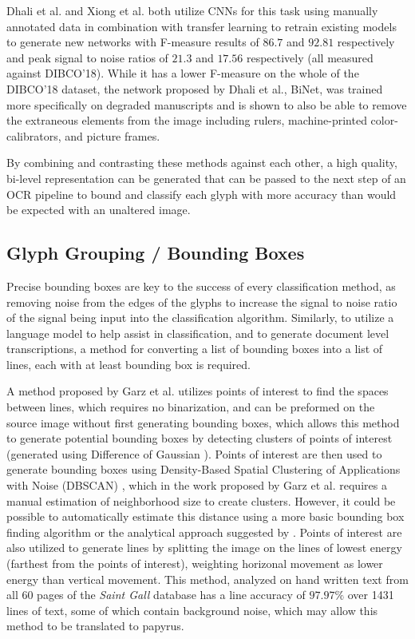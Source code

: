 \documentclass[12pt,a4paper,final]{article}
\begin{document}
Dhali et al.\cite{Dhali2019} and Xiong et al.\cite{Xiong} both utilize CNNs for this task using manually annotated data in combination with transfer learning to retrain existing models to generate new networks with F-measure results of $86.7$ and $92.81$ respectively and peak signal to noise ratios of $21.3$ and $17.56$ respectively (all measured against DIBCO'18). While it has a lower F-measure on the whole of the DIBCO'18 dataset, the network proposed by Dhali et al., BiNet, was trained more specifically on degraded manuscripts and is shown to also be able to remove the extraneous elements from the image including rulers, machine-printed color-calibrators, and picture frames.

By combining and contrasting these methods against each other, a high quality, bi-level representation can be generated that can be passed to the next step of an OCR pipeline to bound and classify each glyph with more accuracy than would be expected with an unaltered image.

\subsection{Glyph Grouping / Bounding Boxes}
Precise bounding boxes are key to the success of every classification method, as removing noise from the edges of the glyphs to increase the signal to noise ratio of the signal being input into the classification algorithm. Similarly, to utilize a language model to help assist in classification, and to generate document level transcriptions, a method for converting a list of bounding boxes into a list of lines, each with at least bounding box is required.

A method proposed by Garz et al.\cite{Garz2012, Garz2011} utilizes points of interest to find the spaces between lines, which requires no binarization, and can be preformed on the source image without first generating bounding boxes, which allows this method to generate potential bounding boxes by detecting clusters of points of interest (generated using Difference of Gaussian \cite{Lowe}). Points of interest are then used to generate bounding boxes using Density-Based Spatial Clustering of Applications with Noise (DBSCAN) \cite{Ester}, which in the work proposed by Garz et al.\cite{Garz2012, Garz2011} requires a manual estimation of neighborhood size to create clusters. However, it could be possible to automatically estimate this distance using a more basic bounding box finding algorithm or the analytical approach suggested by \cite{Daszykowski}. Points of interest are also utilized to generate lines by splitting the image on the lines of lowest energy (farthest from the points of interest), weighting horizonal movement as lower energy than vertical movement.
This method, analyzed on hand written text from all 60 pages of the \textit{Saint Gall} database has a line accuracy of $97.97\%$ over 1431 lines of text, some of which contain background noise, which may allow this method to be translated to papyrus.
\end{document}
